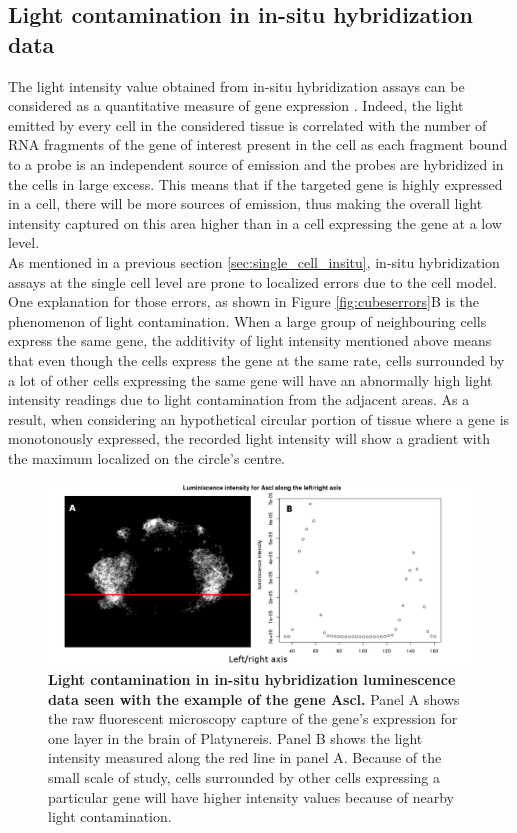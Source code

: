   \subsection{Light contamination in in-situ hybridization data}
  The light intensity value obtained from in-situ hybridization assays can be considered as a quantitative measure of gene expression \cite{dorresteijn90}. Indeed, the light emitted by every cell in the considered tissue is correlated with the number of RNA fragments of the gene of interest present in the cell as each fragment bound to a probe is an independent source of emission and the probes are hybridized in the cells in large excess. This means that if the targeted gene is highly expressed in a cell, there will be more sources of emission, thus making the overall light intensity captured on this area higher than in a cell expressing the gene at a low level. \\
  
  As mentioned in a previous section \ref{sec:single_cell_insitu}, in-situ hybridization assays at the single cell level are prone to localized errors due to the cell model. One explanation for those errors, as shown in Figure \ref{fig:cubeserrors}B is the phenomenon of light contamination. When a large group of neighbouring cells express the same gene, the additivity of light intensity mentioned above means that even though the cells express the gene at the same rate, cells surrounded by a lot of other cells expressing the same gene will have an abnormally high light intensity readings due to light contamination from the adjacent areas. As a result, when considering an hypothetical circular portion of tissue where a gene is monotonously expressed, the recorded light intensity will show a gradient with the maximum localized on the circle's centre.\\
  
   \begin{figure}[h]
\centerline{\includegraphics[width=\linewidth]{gfx/chapter2/whybina.png}}
\caption{{\bf Light contamination in in-situ hybridization luminescence data seen with the example of the gene Ascl.} Panel A shows the raw fluorescent microscopy capture of the gene's expression for one layer in the brain of Platynereis. Panel B shows the light intensity measured along the red line in panel A. Because of the small scale of study, cells surrounded by other cells expressing a particular gene will have higher intensity values because of nearby light contamination.}\label{fig:why_binarize}
	\end{figure}
  
